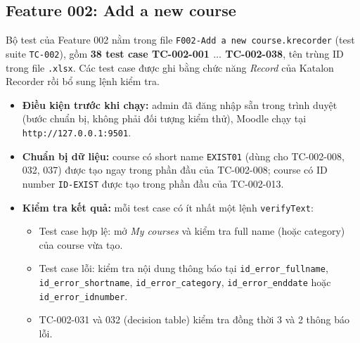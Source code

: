 \documentclass[12pt,a4paper]{article}
\begin{document}
\subsection{Feature 002: Add a new course}
Bộ test của Feature 002 nằm trong file \texttt{F002-Add a new course.krecorder} (test suite \texttt{TC-002}), gồm
\textbf{38 test case TC-002-001 $\dots$ TC-002-038}, tên trùng ID trong file \texttt{.xlsx}. Các test case được ghi bằng chức năng
\textit{Record} của Katalon Recorder rồi bổ sung lệnh kiểm tra.
\begin{itemize}[noitemsep]
  \item \textbf{Điều kiện trước khi chạy:} admin đã đăng nhập sẵn trong trình duyệt (bước chuẩn bị, không phải đối tượng kiểm thử),
        Moodle chạy tại \texttt{http://127.0.0.1:9501}.
  \item \textbf{Chuẩn bị dữ liệu:} course có short name \texttt{EXIST01} (dùng cho TC-002-008, 032, 037) được tạo ngay trong phần
        đầu của TC-002-008; course có ID number \texttt{ID-EXIST} được tạo trong phần đầu của TC-002-013.
  \item \textbf{Kiểm tra kết quả:} mỗi test case có ít nhất một lệnh \texttt{verifyText}:
        \begin{itemize}[noitemsep]
          \item Test case hợp lệ: mở \textit{My courses} và kiểm tra full name (hoặc category) của course vừa tạo.
          \item Test case lỗi: kiểm tra nội dung thông báo tại \texttt{id\_error\_fullname}, \texttt{id\_error\_shortname},
                \texttt{id\_error\_category}, \texttt{id\_error\_enddate} hoặc \texttt{id\_error\_idnumber}.
          \item TC-002-031 và 032 (decision table) kiểm tra đồng thời 3 và 2 thông báo lỗi.
        \end{itemize}
\end{itemize}
\end{document}
